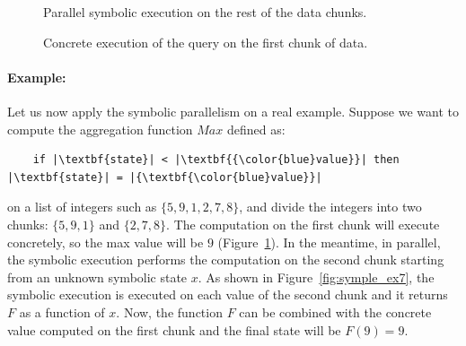 \begin{refsection}
\begin{figure}
\begin{minipage}[b]{0.3\textwidth}
    \caption{Parallel symbolic execution on the rest of the data chunks.}
    \label{fig:symple_ex4}
  \end{minipage}
  \hfill
  \begin{minipage}[b]{0.3\textwidth}
    \begin{flushright}
      \centering
      \caption{Concrete execution of the query on the first chunk of data.}
      \label{fig:symple_ex6}
    \end{flushright}
  \end{minipage}
\end{figure}

\paragraph*{Example:}
Let us now apply the symbolic parallelism on a real example.
%
Suppose we want to compute the aggregation function $Max$ defined as:

\begin{center}
  \begin{lstlisting}
    if |\textbf{state}| < |\textbf{{\color{blue}value}}| then |\textbf{state}| = |{\textbf{\color{blue}value}}|
  \end{lstlisting}
\end{center}

\noindent
on a list of integers such as $\{5, 9, 1, 2, 7, 8\}$, and divide the integers
into two chunks: $\{5, 9, 1\}$ and $\{2, 7, 8\}$.
%
The computation on the first chunk will execute concretely, so the max value
will be $9$ (Figure~\ref{fig:symple_ex6}).
%
In the meantime, in parallel, the symbolic execution performs the computation
on the second chunk starting from an unknown symbolic state $x$.
%
As shown in Figure~\ref{fig:symple_ex7}, the symbolic execution is executed on
each value of the second chunk and it returns $F$ as a function of $x$.
%
Now, the function $F$ can be combined with the concrete value computed on the
first chunk and the final state will be $F(9)=9$.


\end{refsection}
